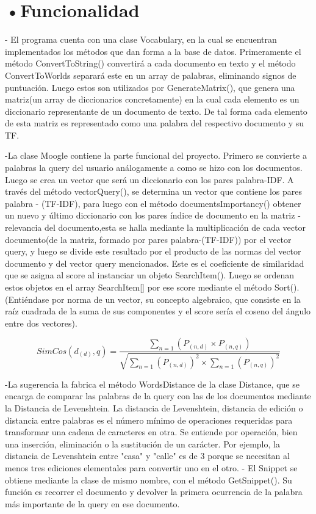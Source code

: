 \documentclass[aspectratio = 169, 14pt]{article}
\begin{document}
\section{•Funcionalidad}
\begin{Large}

- El programa cuenta con una clase
Vocabulary, en la cual se encuentran
implementados los métodos que dan forma a
la base de datos. Primeramente el método
ConvertToString() convertirá a cada
documento en texto y el método
ConvertToWorlds separará este en un array de
palabras, eliminando signos de puntuación.
Luego estos son utilizados por
GenerateMatrix(), que genera una matriz(un
array de diccionarios concretamente) en la
cual cada elemento es un diccionario
representante de un documento de texto. De
tal forma cada elemento de esta matriz es
representado como una palabra del respectivo
documento y su TF.

-La clase Moogle contiene la parte funcional
del proyecto. Primero se convierte a palabras
la query del usuario análogamente a como se
hizo con los documentos. Luego se crea un
vector que será un diccionario con los pares
palabra-IDF. A través del método vectorQuery(),
se determina un vector que contiene los pares
palabra - (TF-IDF), para luego con el método
documentsImportancy() obtener un nuevo y
último diccionario con los pares índice de
documento en la matriz - relevancia del
documento,esta se halla mediante la
multiplicación de cada vector
documento(de la matriz, formado por pares
palabra-(TF-IDF)) por el vector query, y luego
se divide este resultado por el producto de las
normas del vector documento y del vector
query mencionados. Este es el coeficiente de
similaridad que se asigna al score al
instanciar un objeto SearchItem(). Luego se
ordenan estos objetos en el array SearchItem[]
por ese score mediante el método Sort().
(Entiéndase por norma de un vector, su
concepto algebraico, que consiste en la raíz
cuadrada de la suma de sus componentes y el
score sería el coseno del ángulo entre dos
vectores).

\begin{displaymath}
SimCos(d_{(d)},q)=\frac{\displaystyle\sum_{n=1}(P_{(n,d)}\times P_{(n,q)})}{\sqrt{\displaystyle\sum_{n=1}(P_{(n,d)})^2 \times \displaystyle\sum_{n=1}(P_{(n,q)})^2}}
\end{displaymath}

-La sugerencia la fabrica el método
WordsDistance de la clase Distance, que se
encarga de comparar las palabras de la query
con las de los documentos mediante la
Distancia de Levenshtein.
La distancia de Levenshtein, distancia de
edición o distancia entre palabras es el
número mínimo de operaciones requeridas
para transformar una cadena de caracteres en
otra. Se entiende por operación, bien una
inserción, eliminación o la sustitución de un
carácter. Por ejemplo, la distancia de
Levenshtein entre "casa" y "calle" es de 3
porque se necesitan al menos tres ediciones
elementales para convertir uno en el otro.
- El Snippet se obtiene mediante la clase de
mismo nombre, con el método GetSnippet().
Su función es recorrer el documento y devolver
la primera ocurrencia de la palabra más
importante de la query en ese documento.


\end{Large}
\end{document}
